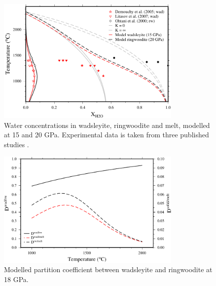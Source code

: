 \documentclass[review]{elsarticle}
\begin{document}
\begin{figure}[ht!]
  \centering
      \includegraphics[width=0.8\textwidth]{figures/wad_rw}
  \caption{Water concentrations in wadsleyite, ringwoodite and melt, modelled at 15 and 20 GPa. Experimental data is taken from three published studies \citep{OMY2000,DDFK2005,LSOK2011}.}
  \label{fig:wad_rw}
\end{figure}

\begin{figure}[ht!]
  \centering
  \includegraphics[width=0.8\textwidth]{figures/wad_rw_partitioning}
  \caption{Modelled partition coefficient between wadsleyite and ringwoodite at 18 GPa.}
  \label{fig:partitioning}
\end{figure}
\end{document}
